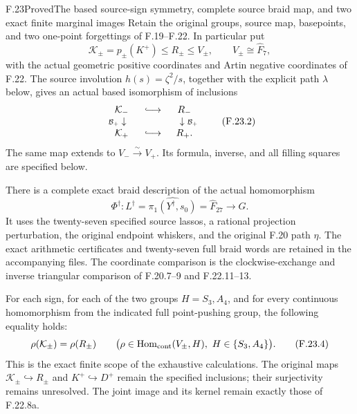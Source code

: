 \begin{claim}{F.23}{Proved}{The based source-sign symmetry, complete source braid map, and two exact finite marginal images}
Retain the original groups, source map, basepoints, and two
one-point forgettings of F.19--F.22. In particular put
\[
 \mathcal K_\pm=p_\pm(K^+)\leq R_\pm\leq V_\pm,
       \qquad V_\pm\cong\widehat F_7,
                                                               \tag{F.23.1}
\]
with the actual geometric positive coordinates and Artin negative
coordinates of F.22. The source involution
$h(s)=\zeta^2/s$, together with the explicit path $\lambda$ below,
gives an actual based isomorphism of inclusions
\[
 \begin{array}{ccc}
 \mathcal K_-&\lhook\joinrel\longrightarrow&R_-\\
 {\scriptstyle\mathcal B_+}\downarrow\phantom{\scriptstyle\sim}
       &&\phantom{\scriptstyle\sim}\downarrow{\scriptstyle\mathcal B_+}\\
 \mathcal K_+&\lhook\joinrel\longrightarrow&R_+ .
 \end{array}                                                  \tag{F.23.2}
\]
The same map extends to $V_-\xrightarrow{\sim}V_+$.
Its formula, inverse, and all filling squares are specified below.

There is a complete exact braid description of the actual homomorphism
\[
 \Phi^\dagger:L^\dagger=\widehat{\pi_1(Y^\dagger,s_0)}
                       =\widehat F_{27}\longrightarrow G.
                                                               \tag{F.23.3}
\]
It uses the twenty-seven specified source lassos, a rational
projection perturbation, the original endpoint whiskers, and the
original F.20 path $\eta$. The exact arithmetic certificates and
twenty-seven full braid words are retained in the accompanying
files. The coordinate comparison is the clockwise-exchange and
inverse triangular comparison of F.20.7--9 and F.22.11--13.

For each sign, for each of the two groups $H=S_3,A_4$, and for
every continuous homomorphism from the indicated full point-pushing
group, the following equality holds:
\[
 \rho(\mathcal K_\pm)=\rho(R_\pm)
       \qquad\bigl(\rho\in\operatorname{Hom}_{\rm cont}(V_\pm,H),
                              \ H\in\{S_3,A_4\}\bigr).
                                                               \tag{F.23.4}
\]
This is the exact finite scope of the exhaustive calculations.
The original maps $\mathcal K_\pm\hookrightarrow R_\pm$ and
$K^+\hookrightarrow D^+$ remain the specified inclusions;
their surjectivity remains unresolved. The joint image and its
kernel remain exactly those of F.22.8a.
\end{claim}


